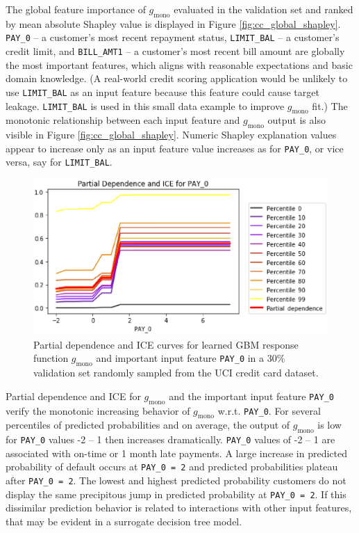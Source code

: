 \documentclass[11pt]{asaproc}
\begin{document}
The global feature importance of $g_{\text{mono}}$ evaluated in the validation set and ranked by mean absolute Shapley value is displayed in Figure \ref{fig:cc_global_shapley}. \texttt{PAY\_0} -- a customer's most recent repayment status, \texttt{LIMIT\_BAL} -- a customer's credit limit, and \texttt{BILL\_AMT1} -- a customer's most recent bill amount are globally the most important features, which aligns with reasonable expectations and basic domain knowledge. (A real-world credit scoring application would be unlikely to use \texttt{LIMIT\_BAL} as an input feature because this feature could cause target leakage. \texttt{LIMIT\_BAL} is used in this small data example to improve $g_{\text{mono}}$ fit.) The monotonic relationship between each input feature and $g_{\text{mono}}$ output is also visible in Figure \ref{fig:cc_global_shapley}. Numeric Shapley explanation values appear to increase only as an input feature value increases as for \texttt{PAY\_0}, or vice versa, say for \texttt{LIMIT\_BAL}. 

\begin{figure}[htb]
	\begin{center}
		\includegraphics[scale=0.6]{img/figure_8.eps}
		\caption{Partial dependence and ICE curves for learned GBM response function $g_{\text{mono}}$ and important input feature \texttt{PAY\_0} in a 30\% validation set randomly sampled from the UCI credit card dataset.}
		\label{fig:cc_pdp_ice}
	\end{center}
\end{figure}

Partial dependence and ICE for $g_{\text{mono}}$ and the important input feature \texttt{PAY\_0} verify the monotonic increasing behavior of $g_{\text{mono}}$ w.r.t. \texttt{PAY\_0}. For several percentiles of predicted probabilities and on average, the output of $g_{\text{mono}}$ is low for \texttt{PAY\_0} values -2 -- 1 then increases dramatically. \texttt{PAY\_0} values of -2 -- 1 are associated with on-time or 1 month late payments. A large increase in predicted probability of default occurs at \texttt{PAY\_0 = 2} and predicted probabilities plateau after \texttt{PAY\_0 = 2}. The lowest and highest predicted probability customers do not display the same precipitous jump in predicted probability at \texttt{PAY\_0 = 2}. If this dissimilar prediction behavior is related to interactions with other input features, that may be evident in a surrogate decision tree model.
\end{document}
